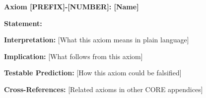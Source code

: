\begin{tcolorbox}[colback=red!5!white, colframe=red!75!black, 
    title=CORE Axiom Template]
    
\textbf{Axiom [PREFIX]-[NUMBER]: [Name]}

\textbf{Statement:}
\begin{equation}
[Formal mathematical statement]
\end{equation}

\textbf{Interpretation:} [What this axiom means in plain language]

\textbf{Implication:} [What follows from this axiom]

\textbf{Testable Prediction:} [How this axiom could be falsified]

\textbf{Cross-References:} [Related axioms in other CORE appendices]

\end{tcolorbox}


%
%
%
%
%
%



